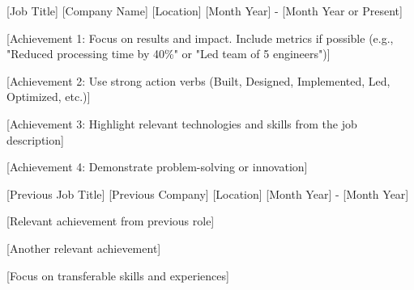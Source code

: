 
\begin{cventries}


  \cventry
    {[Job Title]} %
    {[Company Name]} %
    {[Location]} %
    {[Month Year] - [Month Year or Present]} %
    {
      \begin{cvitems} %
        \item {[Achievement 1: Focus on results and impact. Include metrics if possible (e.g., "Reduced processing time by 40\%" or "Led team of 5 engineers")]}
        \item {[Achievement 2: Use strong action verbs (Built, Designed, Implemented, Led, Optimized, etc.)]}
        \item {[Achievement 3: Highlight relevant technologies and skills from the job description]}
        \item {[Achievement 4: Demonstrate problem-solving or innovation]}
      \end{cvitems}
    }

  \cventry
    {[Previous Job Title]} %
    {[Previous Company]} %
    {[Location]} %
    {[Month Year] - [Month Year]} %
    {
      \begin{cvitems}
        \item {[Relevant achievement from previous role]}
        \item {[Another relevant achievement]}
        \item {[Focus on transferable skills and experiences]}
      \end{cvitems}
    }


\end{cventries}
